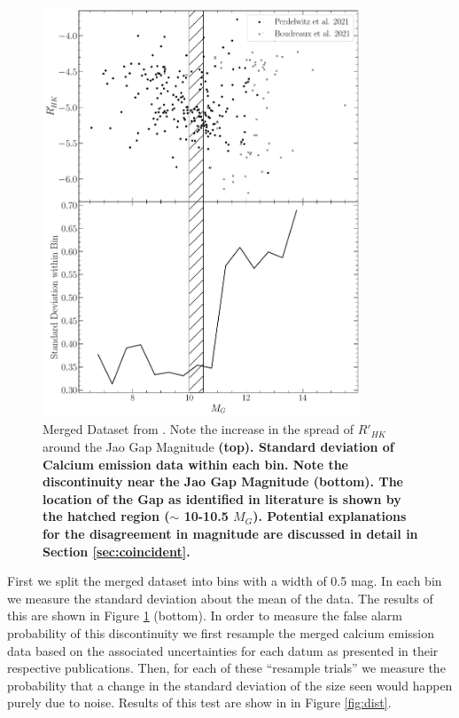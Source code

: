 \begin{figure}
  \centering
  \includegraphics[width=0.85\textwidth]{figures/jaoMagActivity/CombinedDeviation.pdf}
  \caption{Merged Dataset from \citet{Perdelwitz2021, Boudreaux2022}. Note the
  increase in the spread of $R'_{HK}$ around the Jao Gap Magnitude \textbf{(top).
  Standard deviation of Calcium emission data within each bin. Note the
  discontinuity near the Jao Gap Magnitude (bottom). The location of the Gap
  as identified in literature is shown by the hatched region ($\sim$ 10-10.5 $M_{G}$). Potential
  explanations for the disagreement in magnitude are discussed in detail
  in Section \ref{sec:coincident}.}}
  \label{fig:initData}
\end{figure}

First we split the merged dataset into bins with a width of 0.5 mag. In each bin we
measure the standard deviation about the mean of the data. The results of this
are shown in Figure \ref{fig:initData} (bottom). In order to measure the false alarm
probability of this discontinuity we first resample the merged calcium
emission data based on the associated uncertainties for each datum as
presented in their respective publications. Then, for each of these ``resample
trials'' we measure the probability that a change in the standard deviation of
the size seen would happen purely due to noise. Results of this test are show in
in Figure \ref{fig:dist}. 


